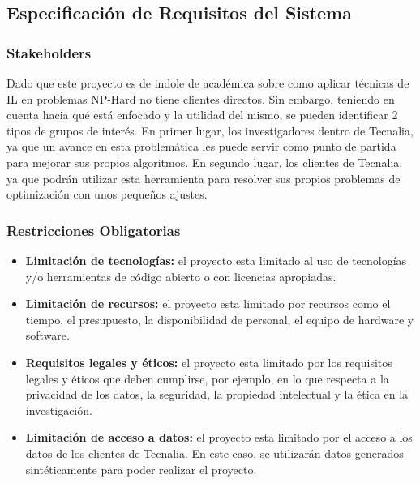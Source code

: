 \subsection{Especificación de Requisitos del Sistema}

\subsubsection{Stakeholders}
Dado que este proyecto es de indole de académica sobre como aplicar 
técnicas de IL en problemas NP-Hard no tiene clientes directos. Sin embargo, 
teniendo en cuenta hacia qué está enfocado y la utilidad del mismo, se pueden 
identificar 2 tipos de grupos de interés. En primer lugar, los investigadores 
dentro de Tecnalia, ya que un avance en esta problemática les puede servir como punto de partida
para mejorar sus propios algoritmos. En segundo lugar, los clientes de Tecnalia,
ya que podrán utilizar esta herramienta para resolver sus propios problemas de
optimización con unos pequeños ajustes.

\subsubsection{Restricciones Obligatorias}
\begin{itemize}
    \item \textbf{Limitación de tecnologías:} el proyecto esta limitado al uso de
    tecnologías y/o herramientas de código abierto o con licencias apropiadas.
    \item \textbf{Limitación de recursos:} el proyecto esta limitado 
    por recursos como el tiempo, el presupuesto, la disponibilidad de personal, 
    el equipo de hardware y software.
    \item \textbf{Requisitos legales y éticos:} el proyecto esta limitado 
    por los requisitos legales y éticos que deben cumplirse, por ejemplo, en lo 
    que respecta a la privacidad de los datos, la seguridad, la propiedad intelectual 
    y la ética en la investigación.
    \item \textbf{Limitación de acceso a datos:} el proyecto esta limitado
    por el acceso a los datos de los clientes de Tecnalia. En este caso, se
    utilizarán datos generados sintéticamente para poder realizar el proyecto.
\end{itemize}

